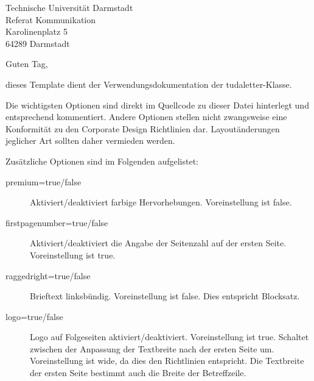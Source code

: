 \documentclass[
	ngerman,%
	accentcolor=9c,%
	premium=true,%
]{tudaletter}
\begin{document}
\begin{letter}{%
	Technische Universität Darmstadt\\%
	Referat Kommunikation\\%
	Karolinenplatz 5\\%
	64289 Darmstadt}


\opening{Guten Tag,}
dieses Template dient der Verwendungsdokumentation der tudaletter-Klasse.

Die wichtigsten Optionen sind direkt im Quellcode zu dieser Datei hinterlegt und entsprechend kommentiert.
Andere Optionen stellen nicht zwangsweise eine Konformität zu den Corporate Design Richtlinien dar.
Layoutänderungen jeglicher Art sollten daher vermieden werden.

Zusätzliche Optionen sind im Folgenden aufgelistet:\\
\parbox{\linewidth}{
	\begin{description}
		\item[premium=true/false] Aktiviert/deaktiviert farbige Hervorhebungen. Voreinstellung ist false.
		\item[firstpagenumber=true/false] Aktiviert/deaktiviert die Angabe der Seitenzahl auf der ersten Seite. Voreinstellung ist true.
		\item[raggedright=true/false] Brieftext linksbündig. Voreinstellung ist false. Dies entspricht Blocksatz.
		\item[logo=true/false] Logo auf Folgeseiten aktiviert/deaktiviert. Voreinstellung ist true.
		      Schaltet zwischen der Anpassung der Textbreite nach der ersten Seite um. Voreinstellung ist wide, da dies den Richtlinien entspricht. Die Textbreite der ersten Seite bestimmt auch die Breite der Betreffzeile.
	\end{description}
}


\end{letter}
\end{document}
